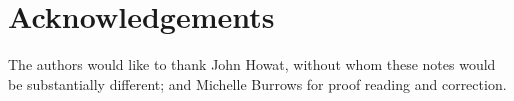 \chapter{Acknowledgements}

The authors would like to thank John Howat, without whom these notes
would be substantially different; and Michelle Burrows for proof
reading and correction.
